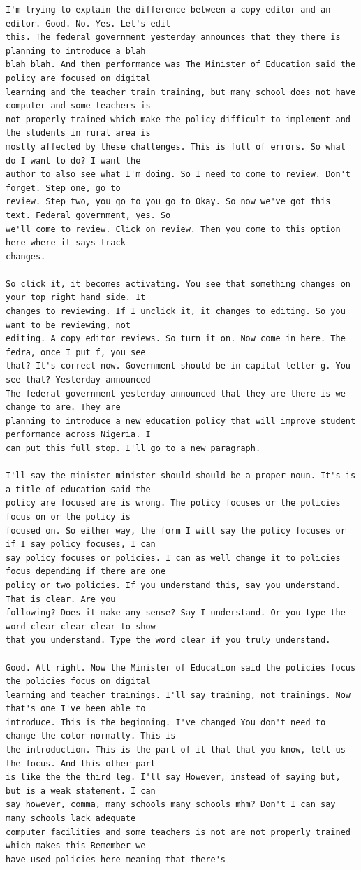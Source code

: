 {\begin{Verbatim}
I'm trying to explain the difference between a copy editor and an editor. Good. No. Yes. Let's edit
this. The federal government yesterday announces that they there is planning to introduce a blah
blah blah. And then performance was The Minister of Education said the policy are focused on digital
learning and the teacher train training, but many school does not have computer and some teachers is
not properly trained which make the policy difficult to implement and the students in rural area is
mostly affected by these challenges. This is full of errors. So what do I want to do? I want the
author to also see what I'm doing. So I need to come to review. Don't forget. Step one, go to
review. Step two, you go to you go to Okay. So now we've got this text. Federal government, yes. So
we'll come to review. Click on review. Then you come to this option here where it says track
changes.

So click it, it becomes activating. You see that something changes on your top right hand side. It
changes to reviewing. If I unclick it, it changes to editing. So you want to be reviewing, not
editing. A copy editor reviews. So turn it on. Now come in here. The fedra, once I put f, you see
that? It's correct now. Government should be in capital letter g. You see that? Yesterday announced
The federal government yesterday announced that they are there is we change to are. They are
planning to introduce a new education policy that will improve student performance across Nigeria. I
can put this full stop. I'll go to a new paragraph.

I'll say the minister minister should should be a proper noun. It's is a title of education said the
policy are focused are is wrong. The policy focuses or the policies focus on or the policy is
focused on. So either way, the form I will say the policy focuses or if I say policy focuses, I can
say policy focuses or policies. I can as well change it to policies focus depending if there are one
policy or two policies. If you understand this, say you understand. That is clear. Are you
following? Does it make any sense? Say I understand. Or you type the word clear clear clear to show
that you understand. Type the word clear if you truly understand.

Good. All right. Now the Minister of Education said the policies focus the policies focus on digital
learning and teacher trainings. I'll say training, not trainings. Now that's one I've been able to
introduce. This is the beginning. I've changed You don't need to change the color normally. This is
the introduction. This is the part of it that that you know, tell us the focus. And this other part
is like the the third leg. I'll say However, instead of saying but, but is a weak statement. I can
say however, comma, many schools many schools mhm? Don't I can say many schools lack adequate
computer facilities and some teachers is not are not properly trained which makes this Remember we
have used policies here meaning that there's


\end{Verbatim}}
